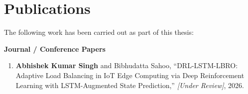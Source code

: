 \chapter*{Publications}
\thispagestyle{plain}

The following work has been carried out as part of this thesis:

\vspace{0.5cm}
\noindent\textbf{Journal / Conference Papers}

\begin{enumerate}

  \item \textbf{Abhishek Kumar Singh} and Bibhudatta Sahoo,
  ``DRL-LSTM-LBRO: Adaptive Load Balancing in IoT Edge Computing via
  Deep Reinforcement Learning with LSTM-Augmented State Prediction,''
  \textit{[Under Review]}, 2026.


\end{enumerate}

